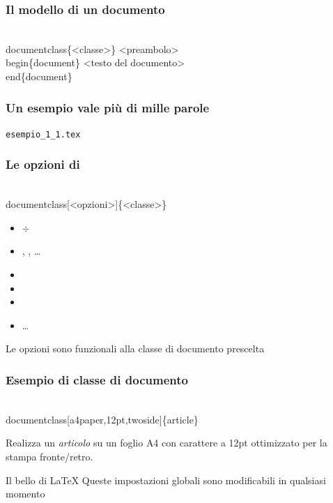 \documentclass[svgnames,%
	ucs,%
	pdftex]{guitbeamer}
\begin{document}
\begin{frame}
  \frametitle{Il modello di un documento}
	\begin{LaTeXcode}
		\\documentclass\{\alert{<classe>}\}\n
	  \onslide<4->
		\hspace*{5ex}\alert{<preambolo>}\nn
	  \onslide<2->
		\\begin\{document\}\n
	  \onslide<3->
		\hspace*{5ex}\alert{<testo del documento>}\n
	  \onslide<2->
		\\end\{document\}
	\end{LaTeXcode}
\end{frame}
\begin{frame}
  \frametitle{Un esempio vale pi\`u di mille parole}
	\begin{center}
		\alert{\texttt{esempio\_1\_1.tex}}
	\end{center}
\end{frame}
\begin{frame}
  \frametitle{Le opzioni di }
	\begin{LaTeXcode}
		\\documentclass[\alert{<opzioni>}]\{<classe>\}
	\end{LaTeXcode}
	\begin{itemize}
		\item \Lopt{8pt} $\div$ \Lopt{12pt}
		\item {}, , \dots
		\item {}%
		\item {}%
		\item {}%
		\item \dots
	\end{itemize}
  \bigskip
	Le opzioni sono funzionali alla classe di documento prescelta
\end{frame}
\begin{frame}
  \frametitle{Esempio di classe di documento}
	\begin{LaTeXcode}
		\\documentclass[\alert{a4paper,12pt,twoside}]\{\alert{article}\}
	\end{LaTeXcode}
	Realizza un \emph{articolo} su un foglio \alert{A4} con carattere
	a \alert{12pt} ottimizzato per la stampa \alert{fronte/retro}.
  \bigskip
	\begin{block}{Il bello di \LaTeX}
		Queste impostazioni globali sono modificabili in qualsiasi momento
	\end{block}
\end{frame}
\end{document}
